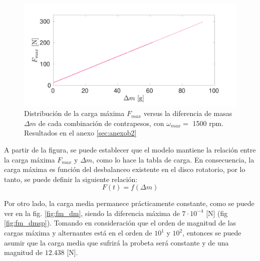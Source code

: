 \begin{figure}[h]
\centering
\includegraphics[width=\linewidth, trim={0cm 0cm 2cm 0cm},clip]{Imagenes/fmax_dm_25.pdf}
\caption{Distribución de la carga máxima $F_{max}$ versus la diferencia de masas $\Delta m$ de cada combinación de contrapesos, con $\omega_{max} =$ 1500 rpm. Resultados en el anexo \ref{sec:anexob2}}
\label{fig:fmax_dm25}
\end{figure}

A partir de la figura, se puede establecer que el modelo mantiene la relación entre la carga máxima $F_{max}$ y $\Delta m$, como lo hace la tabla de carga. En consecuencia, la carga máxima es función del desbalanceo existente en el disco rotatorio, por lo tanto, se puede definir la siguiente relación: 
\begin{equation}\label{eq:func_dm}
	F(t) = f(\Delta m)
\end{equation}

Por otro lado, la carga media permanece prácticamente constante, como se puede ver en la fig. \ref{fig:fm_dm}, siendo la diferencia máxima de $7\cdot10^{-4}$ [N] (fig \ref{fig:fm_dmsp}). Tomando en consideración que el orden de magnitud de las cargas máxima y alternantes está en el orden de $10^1$ y $10^2$, entonces se puede asumir que la carga media que sufrirá la probeta será constante y de una magnitud de $12.438$ [N]. 


